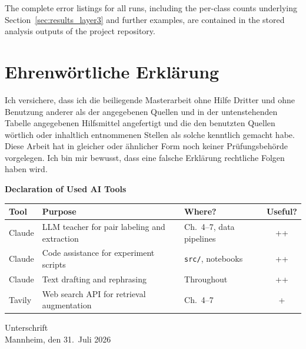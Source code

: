\documentclass[a4paper,oneside,bibliography=totoc]{scrbook}
\begin{document}
The complete error listings for all runs, including the per-class counts underlying Section~\ref{sec:results_layer3} and further examples, are contained in the stored analysis outputs of the project repository.

\backmatter
\chapter{Ehrenwörtliche Erklärung}

Ich versichere, dass ich die beiliegende Masterarbeit ohne Hilfe Dritter und ohne Benutzung anderer als der angegebenen Quellen und in der untenstehenden Tabelle angegebenen Hilfsmittel angefertigt und die den benutzten Quellen wörtlich oder inhaltlich entnommenen Stellen als solche kenntlich gemacht habe. Diese Arbeit hat in gleicher oder ähnlicher Form noch keiner Prüfungsbehörde vorgelegen. Ich bin mir bewusst, dass eine falsche Erklärung rechtliche Folgen haben wird.

\begin{center}
  \textbf{Declaration of Used AI Tools} \\[.3em]
  \begin{tabularx}{\textwidth}{lXlc}
    \toprule
    Tool & Purpose & Where? & Useful? \\
    \midrule
    Claude & LLM teacher for pair labeling and extraction & Ch.~4--7, data pipelines & ++ \\
    Claude & Code assistance for experiment scripts & \texttt{src/}, notebooks & ++ \\
    Claude & Text drafting and rephrasing & Throughout & ++ \\
    Tavily & Web search API for retrieval augmentation & Ch.~4--7 & + \\
    \bottomrule
  \end{tabularx}
\end{center}

\vspace{2cm}
\noindent Unterschrift\\
\noindent Mannheim, den 31.~Juli 2026 \hfill
\end{document}
